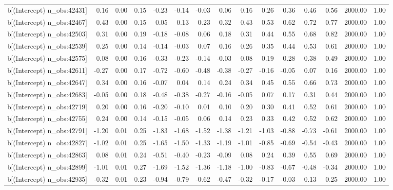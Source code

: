 \begin{table}[ht]
\begin{tabular}{rrrrrrrrrrrrrrr}
  b[(Intercept) n\_obs:42431] & 0.16 & 0.00 & 0.15 & -0.23 & -0.14 & -0.03 & 0.06 & 0.16 & 0.26 & 0.36 & 0.46 & 0.56 & 2000.00 & 1.00 \\ 
  b[(Intercept) n\_obs:42467] & 0.43 & 0.00 & 0.15 & 0.05 & 0.13 & 0.23 & 0.32 & 0.43 & 0.53 & 0.62 & 0.72 & 0.77 & 2000.00 & 1.00 \\ 
  b[(Intercept) n\_obs:42503] & 0.31 & 0.00 & 0.19 & -0.18 & -0.08 & 0.06 & 0.18 & 0.31 & 0.44 & 0.55 & 0.68 & 0.82 & 2000.00 & 1.00 \\ 
  b[(Intercept) n\_obs:42539] & 0.25 & 0.00 & 0.14 & -0.14 & -0.03 & 0.07 & 0.16 & 0.26 & 0.35 & 0.44 & 0.53 & 0.61 & 2000.00 & 1.00 \\ 
  b[(Intercept) n\_obs:42575] & 0.08 & 0.00 & 0.16 & -0.33 & -0.23 & -0.14 & -0.03 & 0.08 & 0.19 & 0.28 & 0.38 & 0.49 & 2000.00 & 1.00 \\ 
  b[(Intercept) n\_obs:42611] & -0.27 & 0.00 & 0.17 & -0.72 & -0.60 & -0.48 & -0.38 & -0.27 & -0.16 & -0.05 & 0.07 & 0.16 & 2000.00 & 1.00 \\ 
  b[(Intercept) n\_obs:42647] & 0.34 & 0.00 & 0.16 & -0.07 & 0.04 & 0.14 & 0.24 & 0.34 & 0.45 & 0.55 & 0.66 & 0.73 & 2000.00 & 1.00 \\ 
  b[(Intercept) n\_obs:42683] & -0.05 & 0.00 & 0.18 & -0.48 & -0.38 & -0.27 & -0.16 & -0.05 & 0.07 & 0.17 & 0.31 & 0.44 & 2000.00 & 1.00 \\ 
  b[(Intercept) n\_obs:42719] & 0.20 & 0.00 & 0.16 & -0.20 & -0.10 & 0.01 & 0.10 & 0.20 & 0.30 & 0.41 & 0.52 & 0.61 & 2000.00 & 1.00 \\ 
  b[(Intercept) n\_obs:42755] & 0.24 & 0.00 & 0.14 & -0.15 & -0.05 & 0.06 & 0.14 & 0.23 & 0.33 & 0.42 & 0.52 & 0.62 & 2000.00 & 1.00 \\ 
  b[(Intercept) n\_obs:42791] & -1.20 & 0.01 & 0.25 & -1.83 & -1.68 & -1.52 & -1.38 & -1.21 & -1.03 & -0.88 & -0.73 & -0.61 & 2000.00 & 1.00 \\ 
  b[(Intercept) n\_obs:42827] & -1.02 & 0.01 & 0.25 & -1.65 & -1.50 & -1.33 & -1.19 & -1.01 & -0.85 & -0.69 & -0.54 & -0.43 & 2000.00 & 1.00 \\ 
  b[(Intercept) n\_obs:42863] & 0.08 & 0.01 & 0.24 & -0.51 & -0.40 & -0.23 & -0.09 & 0.08 & 0.24 & 0.39 & 0.55 & 0.69 & 2000.00 & 1.00 \\ 
  b[(Intercept) n\_obs:42899] & -1.01 & 0.01 & 0.27 & -1.69 & -1.52 & -1.36 & -1.18 & -1.00 & -0.83 & -0.67 & -0.48 & -0.34 & 2000.00 & 1.00 \\ 
  b[(Intercept) n\_obs:42935] & -0.32 & 0.01 & 0.23 & -0.94 & -0.79 & -0.62 & -0.47 & -0.32 & -0.17 & -0.03 & 0.13 & 0.25 & 2000.00 & 1.00 \\ 

\end{tabular}
\end{table}
